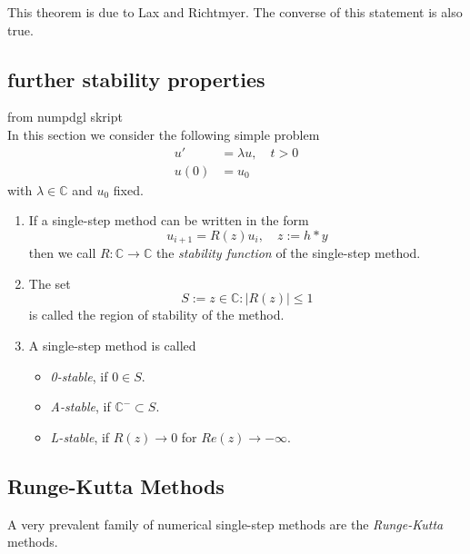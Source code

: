 	This theorem is due to Lax and Richtmyer. The converse of this statement is also true. 

	\subsection{further stability properties}
		from numpdgl skript \\
		In this section we consider the following simple problem
		\begin{align}
			u' &= \lambda u, \quad t > 0 \\
			u(0) &= u_0
		\end{align}
		with $\lambda \in \mathbb{C}$ and $u_0$ fixed.
		
		\begin{definition}
			\begin{enumerate}
				\item 
				If a single-step method can be written in the form
				\begin{equation}
					u_{i+1} = R(z) u_i, \quad z:= h*y
				\end{equation}
				then we call $R: \mathbb{C} \to \mathbb{C}$ the \emph{stability function} of the single-step method.
				\item 
				The set
				\begin{equation}
					S := {z \in \mathbb{C} : |R(z)| \leq 1}
				\end{equation}
				is called the region of stability of the method.
				\item 
				A single-step method is called
				\begin{itemize}
					\item \emph{0-stable}, if $0 \in S$.
					\item \emph{A-stable}, if $\mathbb{C}^- \subset S$.
					\item \emph{L-stable}, if $R(z) \to 0$ for $Re(z) \to -\infty$.
				\end{itemize}
			\end{enumerate}
		\end{definition}

	\subsection{Runge-Kutta Methods}
		A very prevalent family of numerical single-step methods are the \emph{Runge-Kutta} methods. 
		
		
